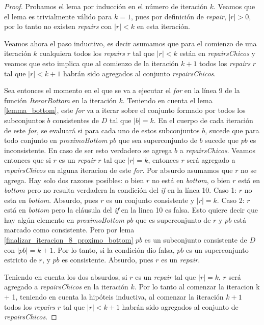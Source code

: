 \documentclass[11pt,a4paper,twoside]{tesis}
\begin{document}
\begin{proof}
Probamos el lema por inducción en el número de iteración $k$. Veamos que el lema es trivialmente válido para $k=1$, pues por definición de \textit{repair}, $|r| > 0$, por lo tanto no existen \textit{repairs} con $|r| < k$ en esta iteración.

Veamos ahora el paso inductivo, es decir asumamos que para el comienzo de una iteración $k$ cualquiera todos los \textit{repairs} $r$ tal que $|r| < k$ están en \textit{repairsChicos} y veamos que esto implica que al comienzo de la iteración $k+1$ todos los \textit{repairs} $r$ tal que $|r| < k + 1$ habrán sido agregados al conjunto \textit{repairsChicos}.


Sea entonces el momento en el que se va a ejecutar el \textit{for} en la línea 9 de la función \textit{IterarBottom} en la iteración $k$. Teniendo en cuenta el lema \ref{lemma_bottom}, este \textit{for} va a iterar sobre el conjunto formado por todos los subconjuntos $b$ consistentes de $D$ tal que $|b| = k$.  En el cuerpo de cada iteración de este \textit{for}, se evaluará si para cada uno de estos subconjuntos $b$, sucede que para todo conjunto en \textit{proximoBottom} $pb$ que sea superconjunto de $b$ sucede que $pb$ es inconsistente. En caso de ser esto verdadero se agrega $b$ a \textit{repairsChicos}. Veamos entonces que si $r$ es un \textit{repair} $r$ tal que $|r| = k$, entonces $r$ será  agregado a \textit{repairsChicos} en alguna iteracion de este \textit{for}.
Por absurdo asumamos que $r$ no se agrega. Hay solo dos razones posibles: o bien $r$ no está en \textit{bottom}, o bien $r$ está en \textit{bottom} pero no resulta verdadera la condición del \textit{if} en la línea 10.
Caso 1: $r$ no esta en \textit{bottom}. Absurdo, pues $r$ es un conjunto consistente y $|r| = k$.
Caso 2: $r$ está en \textit{bottom} pero la cláusula del \textit{if} en la linea 10 es falsa. Esto quiere decir que hay algún elemento en \textit{proximoBottom} $pb$ que es superconjunto de $r$ y $pb$ está marcado como consistente. Pero por lema \ref{finalizar_iteracion_8_proximo_bottom} $pb$ es un subconjunto consistente de $D$ con $|pb| = k + 1$. Por lo tanto, si la condición dio falsa, $pb$ es un superconjunto estricto de $r$, y $pb$ es consistente. Absurdo, pues $r$ es un \textit{repair}.


Teniendo en cuenta los dos absurdos, si $r$ es un \textit{repair} tal que $|r| = k$, $r$ será agregado a \textit{repairsChicos} en la iteración $k$. Por lo tanto al comenzar la iteracion k + 1, teniendo en cuenta la hipóteis inductiva, al comenzar la iteración $k+1$ todos los \textit{repairs} $r$ tal que $|r| < k + 1$ habrán sido agregados al conjunto de \textit{repairsChicos}.

\end{proof}
\end{document}
